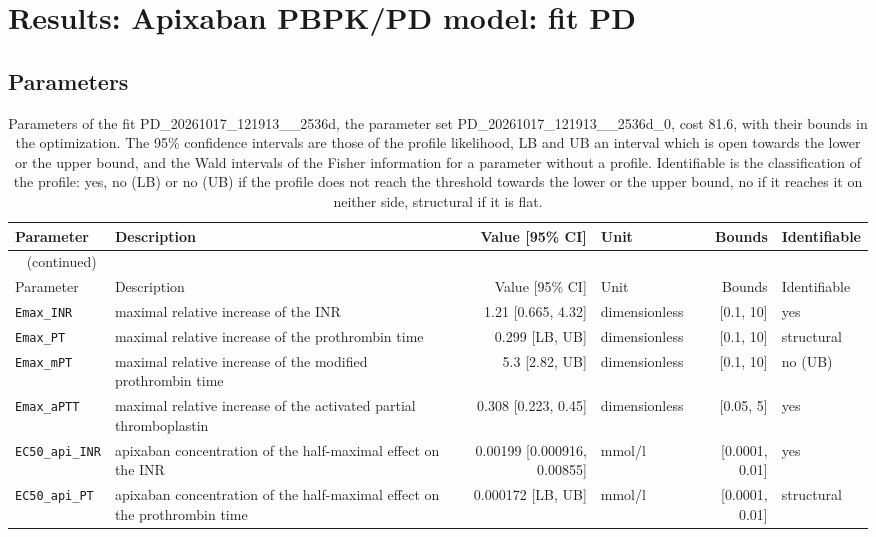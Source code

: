 \documentclass{article}
\begin{document}
\section{Results: Apixaban PBPK/PD model: fit PD}

\subsection{Parameters}

\begin{longtable}{llrlrl}
\caption{Parameters of the fit PD\_20261017\_121913\_\_2536d, the parameter set PD\_20261017\_121913\_\_2536d\_0, cost 81.6, with their bounds in the optimization. The 95\% confidence intervals are those of the profile likelihood, LB and UB an interval which is open towards the lower or the upper bound, and the Wald intervals of the Fisher information for a parameter without a profile. Identifiable is the classification of the profile: yes, no (LB) or no (UB) if the profile does not reach the threshold towards the lower or the upper bound, no if it reaches it on neither side, structural if it is flat.}\label{tab:parameters:PD_20261017_121913__2536d} \\
\toprule
Parameter & Description & Value [95\% CI] & Unit & Bounds & Identifiable \\
\midrule
\endfirsthead
\multicolumn{6}{l}{\small\tablename~\thetable{} (continued)} \\
\toprule
Parameter & Description & Value [95\% CI] & Unit & Bounds & Identifiable \\
\midrule
\endhead
\bottomrule
\endlastfoot
\texttt{Emax\_INR} & maximal relative increase of the INR & 1.21 [0.665, 4.32] & dimensionless & [0.1, 10] & yes \\
\texttt{Emax\_PT} & maximal relative increase of the prothrombin time & 0.299 [LB, UB] & dimensionless & [0.1, 10] & structural \\
\texttt{Emax\_mPT} & maximal relative increase of the modified prothrombin time & 5.3 [2.82, UB] & dimensionless & [0.1, 10] & no (UB) \\
\texttt{Emax\_aPTT} & maximal relative increase of the activated partial thromboplastin & 0.308 [0.223, 0.45] & dimensionless & [0.05, 5] & yes \\
\texttt{EC50\_api\_INR} & apixaban concentration of the half-maximal effect on the INR & 0.00199 [0.000916, 0.00855] & mmol/l & [0.0001, 0.01] & yes \\
\texttt{EC50\_api\_PT} & apixaban concentration of the half-maximal effect on the prothrombin time & 0.000172 [LB, UB] & mmol/l & [0.0001, 0.01] & structural \\

\end{longtable}
\end{document}
